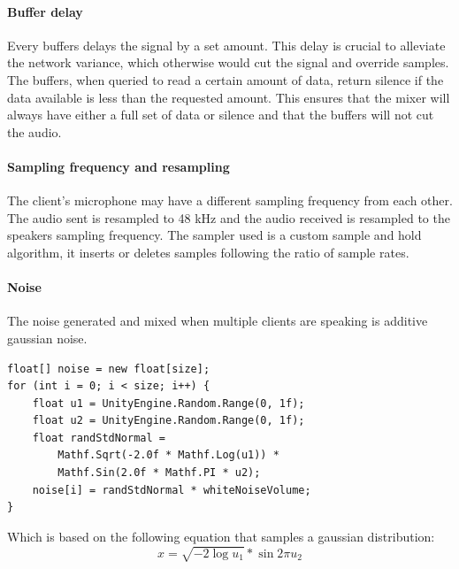 \documentclass[12pt]{article}
\begin{document}
\paragraph{Buffer delay}
Every buffers delays the signal by a set amount. This delay is crucial to alleviate the network variance, which otherwise would cut the signal and override samples. The buffers, when queried to read a certain amount of data, return silence if the data available is less than the requested amount. This ensures that the mixer will always have either a full set of data or silence and that the buffers will not cut the audio.

\clearpage

\paragraph{Sampling frequency and resampling}
The client's microphone may have a different sampling frequency from each other. The audio sent is resampled to 48 kHz and the audio received is resampled to the speakers sampling frequency. The sampler used is a custom sample and hold algorithm, it inserts or deletes samples following the ratio of sample rates.
\paragraph{Noise}
The noise generated and mixed when multiple clients are speaking is additive gaussian noise. \cite{noise}

\medskip

\lstset{style=sharpc}
\begin{lstlisting}
float[] noise = new float[size];
for (int i = 0; i < size; i++) {
    float u1 = UnityEngine.Random.Range(0, 1f);
    float u2 = UnityEngine.Random.Range(0, 1f);
    float randStdNormal =
        Mathf.Sqrt(-2.0f * Mathf.Log(u1)) *
        Mathf.Sin(2.0f * Mathf.PI * u2);
    noise[i] = randStdNormal * whiteNoiseVolume;
}
\end{lstlisting}

\medskip

Which is based on the following equation that samples a gaussian distribution:
\begin{equation} x = \sqrt{-2\log{u_1}} * \sin{2 \pi u_2} \end{equation}

\clearpage
\end{document}
